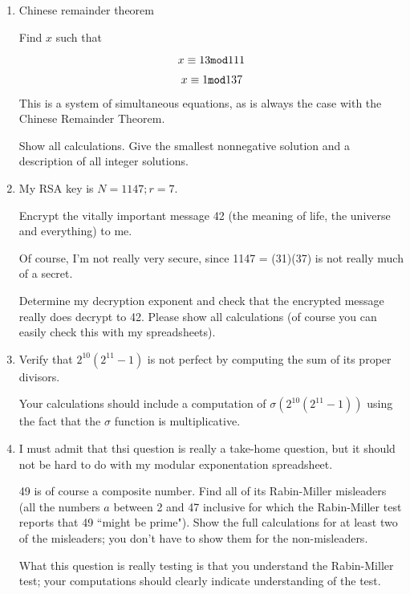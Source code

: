 \documentclass[12pt]{article}
\begin{document}
\begin{enumerate}
\item  Chinese remainder theorem

Find $x$ such that

$$x \equiv 13 {\tt mod}111$$

$$x \equiv 1 {\tt mod} 137$$

This is a system of simultaneous equations, as is always the case with the Chinese Remainder Theorem.

Show all calculations.  Give the smallest nonnegative solution and a description of all integer solutions.

\newpage

\item  My RSA key is $N = 1147; r= 7$.

Encrypt the vitally important message 42 (the meaning of life, the universe and everything) to me.

Of course, I'm not really very secure, since 1147 = (31)(37) is not really much of a secret.

Determine my decryption exponent and check that the encrypted message really does decrypt to 42.  Please show all calculations (of course you can easily check this with my spreadsheets).

\newpage

\item  Verify that $2^{10}(2^{11} -1)$ is not perfect by computing the sum of its proper divisors.

Your calculations should include a computation of  $\sigma(2^{10}(2^{11} -1))$ using the fact that the $\sigma$ function is multiplicative.

\newpage

\item  I must admit that thsi question is really a take-home question, but it should not be hard to do with my modular exponentation spreadsheet.  

49 is of course a composite number.  Find all of its Rabin-Miller misleaders (all the numbers $a$ between 2 and 47 inclusive for which the Rabin-Miller test 
reports that 49 ``might be prime").  Show the full calculations for at least two of the misleaders;  you don't have to show them for the non-misleaders.

What this question is really testing is that you understand the Rabin-Miller test;  your computations should clearly indicate understanding of the test.

\newpage


\end{enumerate}
\end{document}
